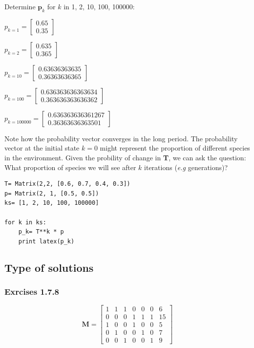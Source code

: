 Determine $\mathbf{p}_k$ for $k$ in 1, 2, 10, 100, 100000:

$p_{k= 1} = \left[\begin{matrix}0.65\\0.35\end{matrix}\right]$

$p_{k= 2} = \left[\begin{matrix}0.635\\0.365\end{matrix}\right]$

$p_{k= 10} = \left[\begin{matrix}0.63636363635\\0.36363636365\end{matrix}\right]$

$p_{k= 100} = \left[\begin{matrix}0.636363636363634\\0.363636363636362\end{matrix}\right]$

$p_{k= 100000} = \left[\begin{matrix}0.636363636361267\\0.36363636363501\end{matrix}\right]$

Note how the probability vector converges in the long period. The probability vector
at the initial state $k = 0$ might represent the proportion of different species
in the environment. Given the probility of change in \textbf{T}, we can ask the question:
What proportion of species we will see after $k$ iterations (\textit{e.g} generations)?

\begin{verbatim}
T= Matrix(2,2, [0.6, 0.7, 0.4, 0.3])
p= Matrix(2, 1, [0.5, 0.5])
ks= [1, 2, 10, 100, 100000]

for k in ks:
    p_k= T**k * p
    print latex(p_k)
\end{verbatim}


\subsection{Type of solutions}

\subsubsection{Exrcises 1.7.8}

\begin{equation}
\textbf{M} = \left[\begin{matrix}1 & 1 & 1 & 0 & 0 & 0 & 6\\0 & 0 & 0 & 1 & 1 & 1 & 15\\1 & 0 & 0 & 1 & 0 & 0 & 5\\0 & 1 & 0 & 0 & 1 & 0 & 7\\0 & 0 & 1 & 0 & 0 & 1 & 9\end{matrix}\right]
\end{equation}

